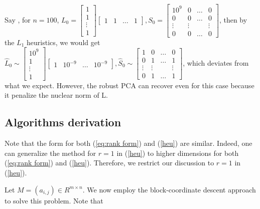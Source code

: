 Say , for $n=100$, $L_{0}=\left[\begin{array}{c}
1\\
1\\
\vdots \\
1
\end{array}\right]
[\begin{array}{cccc}
1 & 1 & \dots & 1
\end{array}], 
S_{0} = 
\left[ \begin{array}{cccc}
10^{9} & 0 & \dots & 0\\
0 & 0 & \dots & 0\\
\vdots & \vdots &  & \vdots\\
0 & 0 & \dots & 0
\end{array}\right]$, 
then by the $L_{1}$ heuristics, we would get $\hat{L}_{0}\sim \left[ \begin{array}{c}
10^{9}\\
1\\
\vdots \\
1
\end{array} \right]
\left[\begin{array}{ccccc}
1 & 10^{-9} & \dots & 10^{-9}
\end{array}\right], 
\hat{S}_{0} \sim 
\left[\begin{array}{cccc}
1 & 0 & \dots & 0\\
0 & 1 & \dots & 1\\
\vdots & \vdots &  & \vdots \\
0 & 1 & \dots & 1
\end{array}\right]$, which deviates from what we expect. However, the robust PCA can recover even for this case because it penalize the nuclear norm of L.

\subsection{Algorithms derivation}

Note that the form for both (\ref{eq:rank form}) and (\ref{heu})
are similar. Indeed, one can generalize the method for $r=1$ in (\ref{heu})
to higher dimensions for both (\ref{eq:rank form}) and (\ref{heu}).
Therefore, we restrict our discussion to $r=1$ in (\ref{heu}).

Let $M=(a_{i,j})\in R^{m \times n}$. We now employ the block-coordinate
descent approach to solve this problem. Note that

